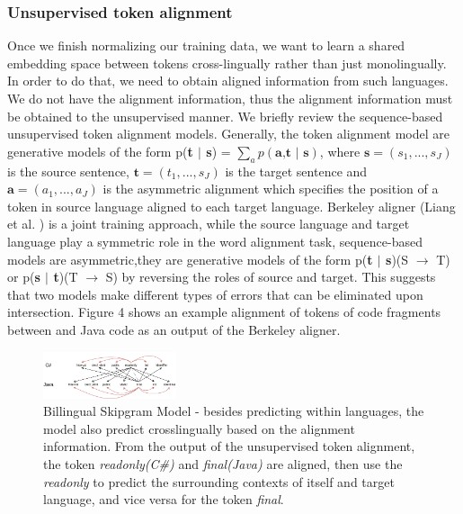 \subsubsection{ Unsupervised token alignment}

Once we finish normalizing our training data, we want to learn a shared embedding space between tokens cross-lingually rather than just monolingually. In order to do that, we need to obtain aligned information from such languages. We do not have the alignment information, thus the alignment information must be obtained to the unsupervised manner. We briefly review the sequence-based unsupervised token alignment models. Generally, the token alignment model are generative models of the form p(\textbf{t $|$ s}) = $\displaystyle\sum_{a} p(\textbf{a,t $|$ s})$, where $\textbf{s} = (s_{1},..., s_{J})$ is the source sentence, $\textbf{t} = (t_{1},..., s_{J})$ is the target sentence and $\textbf{a} = (a_{1},..., a_{J})$ is the asymmetric alignment which specifies the position of a token in source language aligned to each target language. Berkeley aligner (Liang et al. \cite{liang2006alignment}) is a joint training approach, while the source language and target language play a symmetric role in the word alignment task, sequence-based models are asymmetric,they are generative models of the form p(\textbf{t $|$ s})(S $\rightarrow$ T) or p(\textbf{s $|$ t})(T $\rightarrow$ S) by reversing the roles of source and target. This suggests that two models make different types of errors that can be eliminated upon intersection. Figure 4 shows an example alignment of tokens of code fragments between  and Java code as an output of the Berkeley aligner.

\begin{figure}[t!]
	\includegraphics[width=0.35\textwidth]{biskip_align}
	\caption{Billingual Skipgram Model - besides predicting within languages, the model also predict crosslingually based on the alignment information. From the output of the unsupervised token alignment, the token \textit{readonly(C\#)} and \textit{final(Java)} are aligned, then use the \textit{readonly} to predict the surrounding contexts of itself and target language, and vice versa for the token \textit{final}.}
	\label{fig:clf}
\end{figure}

